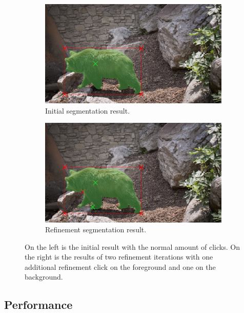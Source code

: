 \begin{figure} 
	\centering
	\begin{subfigure}[b]{0.45\textwidth}
		\centering
		\includegraphics[width=\textwidth]{figures/chap34_bear_6.png}
		\caption{Initial segmentation result.}
		\label{fig:ch3:sec4:refinement_1}
	\end{subfigure}
	\hfill
	\begin{subfigure}[b]{0.45\textwidth}
		\centering
		\includegraphics[width=\textwidth]{figures/chap34_bear_8.png}
		\caption{Refinement segmentation result.}
		\label{fig:ch3:sec4:refinement_2}
	\end{subfigure}
	\caption[IOG Refinement]{
		On the left is the initial result with the normal amount of clicks. 
		On the right is the results of two refinement iterations with one additional refinement click on the foreground and one on the background.
	} \label{fig:ch3:sec4:refinement}
\end{figure}


\subsection{Performance}\label{ord:ch3:sec4:subsec5}

